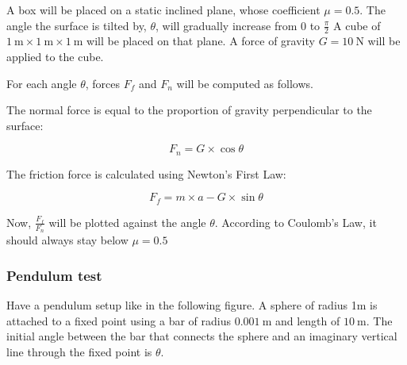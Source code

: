 \documentclass[runningheads]{llncs}
\begin{document}
A box will be placed on a static inclined plane, whose coefficient $\mu = 0.5$.
The angle the surface is tilted by, $\theta$, will gradually increase from 0 to $\frac{\pi}{2}$
A cube of $\SI{1}{\m} \times \SI{1}{\m} \times \SI{1}{\m}$ will be placed on that plane.
A force of gravity $G = \SI{10}{\N}$ will be applied to the cube.

\begin{center}
  \end{center}

For each angle $\theta$, forces $F_f$ and $F_n$ will be computed as follows.

The normal force is equal to the proportion of gravity perpendicular to the surface:

\begin{equation}
F_n = G \times \cos \theta
\end{equation} 

The friction force is calculated using Newton's First Law:

\begin{equation}
F_f = m \times a - G \times \sin \theta
\end{equation}

Now, $\frac{F_f}{F_n}$ will be plotted against the angle $\theta$. According to Coulomb's Law, it should always stay below $\mu = 0.5$

\subsubsection{Pendulum test}

Have a pendulum setup like in the following figure.
A sphere of radius 1m is attached to a fixed point using a bar of radius $\SI{0.001}{\m}$ and length of $\SI{10}{\m}$.
The initial angle between the bar that connects the sphere and an imaginary vertical line through the fixed point is $\theta$.

\begin{center}
  \end{center}
\end{document}
